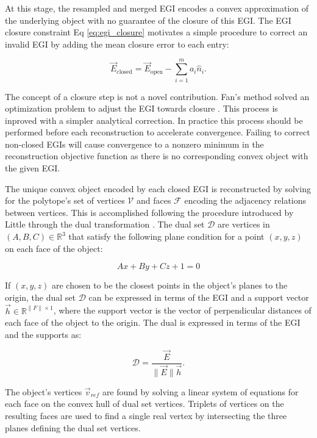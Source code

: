 At this stage, the resampled and merged EGI encodes a convex approximation of the underlying object with no guarantee of the closure of this EGI. The EGI closure constraint Eq \ref{eq:egi_closure} motivates a simple procedure to correct an invalid EGI by adding the mean closure error to each entry:

\begin{equation} \label{eq:egi_validation}
  \vec{E}_{\textrm{closed}} = \vec{E}_{\textrm{open}} - \sum_{i=1}^m a_i \hat{n}_i .
\end{equation}

The concept of a closure step is not a novel contribution. Fan's method solved an optimization problem to adjust the EGI towards closure \cite{fan2020thesis}. This process is inproved with a simpler analytical correction. In practice this process should be performed before each reconstruction to accelerate convergence. Failing to correct non-closed EGIs will cause convergence to a nonzero minimum in the reconstruction objective function as there is no corresponding convex object with the given EGI.

The unique convex object encoded by each closed EGI is reconstructed by solving for the polytope's set of vertices $\mathcal{V}$ and faces $\mathcal{F}$ encoding the adjacency relations between vertices. This is accomplished following the procedure introduced by Little through the dual transformation \cite{little1983}. The dual set $\mathcal{D}$ are vertices in $(A, B, C) \in \mathbb{R}^3$ that satisfy the following plane condition for a point $(x, y, z)$ on each face of the object:

\begin{equation} \label{eq:dual_abc_form}
  Ax + By + Cz + 1 = 0
\end{equation}

If $(x, y, z)$ are chosen to be the closest points in the object's planes to the origin, the dual set $\mathcal{D}$ can be expressed in terms of the EGI and a support vector $\vec{h} \in \mathbb{R}^{\|F\| \times 1}$, where the support vector is the vector of perpendicular distances of each face of the object to the origin. The dual is expressed in terms of the EGI and the supports as:

\begin{equation} \label{eq:dual_egi_form}
  \mathcal{D} = \frac{\vec{E}}{ \| \vec{E} \| \vec{h}}.
\end{equation}

The object's vertices $\vec{v}_{ref}$ are found by solving a linear system of equations for each face on the convex hull of dual set vertices. Triplets of vertices on the resulting faces are used to find a single real vertex by intersecting the three planes defining the dual set vertices.

